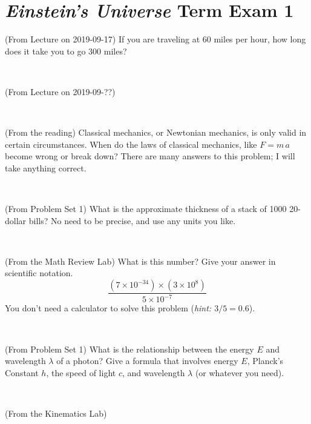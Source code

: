 \documentclass[12pt, letterpaper]{article}
\begin{document}
\section*{\textsl{Einstein's Universe} Term Exam 1}
\setcounter{problem}{1}


\begin{problem} (From Lecture on 2019-09-17)
If you are traveling at 60 miles per hour, how long does
it take you to go 300 miles?
\end{problem}


\vfill ~

\begin{problem} (From Lecture on 2019-09-??)
\end{problem}


\vfill ~

\begin{problem} (From the reading)
Classical mechanics, or Newtonian mechanics, is only valid in certain
circumstances. When do the laws of classical mechanics, like $F =
m\,a$ become wrong or break down? There are many answers to this
problem; I will take anything correct.
\end{problem}


\vfill ~

\begin{problem} (From Problem Set 1)
What is the approximate thickness of a stack of 1000 20-dollar bills?
No need to be precise, and use any units you like.
\end{problem}


\vfill ~


\clearpage


\begin{problem} (From the Math Review Lab)
What is this number? Give your answer in scientific notation.
$$
\frac{(7\times10^{-34})\times(3\times10^8)}{5\times10^{-7}}
$$
You don't need a calculator to solve this problem (\textit{hint: $3/5=0.6$}).
\end{problem}


\vfill ~

\begin{problem} (From Problem Set 1)
What is the relationship between the energy $E$ and wavelength
$\lambda$ of a photon? Give a formula that involves energy $E$,
Planck's Constant $h$, the speed of light $c$, and wavelength
$\lambda$ (or whatever you need).
\end{problem}

\vfill ~

\begin{problem} (From the Kinematics Lab)

\end{problem}
\end{document}
